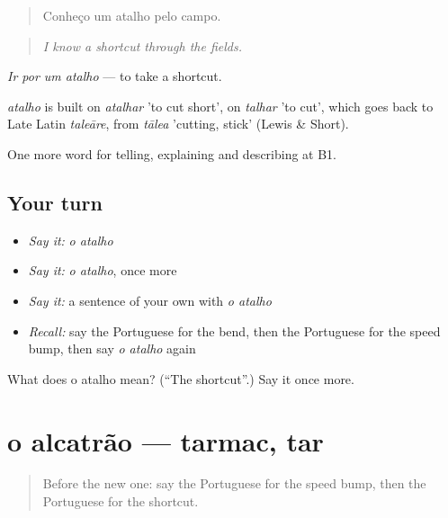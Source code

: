 \begin{quote}
Conheço um atalho pelo campo.
\end{quote}

\begin{quote}
\emph{I know a shortcut through the fields.}
\end{quote}

\emph{Ir por um atalho} — to take a shortcut.

\begin{cousinweb}
\emph{atalho} is built on \emph{atalhar} 'to cut short', on \emph{talhar} 'to cut', which goes back to Late Latin \emph{taleāre}, from \emph{tālea} 'cutting, stick' (Lewis \& Short).
\end{cousinweb}

\begin{grammarlens}[title={What you've built}]
One more word for telling, explaining and describing at B1.
\end{grammarlens}

\subsection*{Your turn}
\begin{itemize}
\raggedright
  \item \emph{Say it:} \emph{o atalho}
  \item \emph{Say it:} \emph{o atalho}, once more
  \item \emph{Say it:} a sentence of your own with \emph{o atalho}
  \item \emph{Recall:} say the Portuguese for the bend, then the Portuguese for the speed bump, then say \emph{o atalho} again
\end{itemize}

\begin{tcolorbox}[breakable,colback=teal!4,colframe=teal!35!black,title={Before you move on}]
What does o atalho mean? (\textquotedblleft{}The shortcut\textquotedblright{}.) Say it once more.
\end{tcolorbox}
\section[o alcatrão]{o alcatrão — tarmac, tar}

\label{lesson:PT-C410-alcatrao}



\begin{quote}
Before the new one: say the Portuguese for the speed bump, then the Portuguese for the shortcut.
\end{quote}

